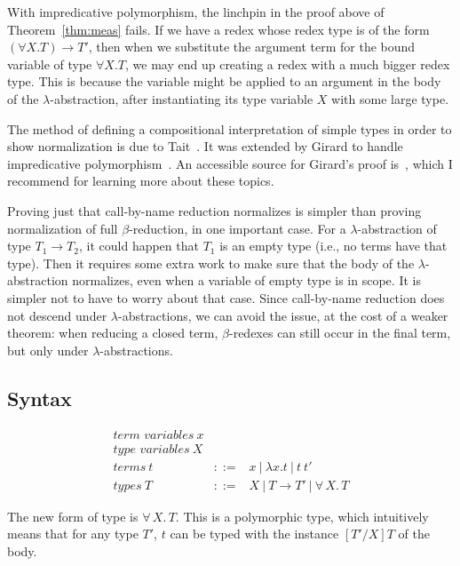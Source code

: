 \documentclass{article}
\begin{document}
With impredicative polymorphism, the linchpin in the proof above of
Theorem~\ref{thm:meas} fails.  If we have a redex whose redex type is
of the form $(\forall X.T) \to T'$, then when we substitute the
argument term for the bound variable of type $\forall X.T$, we may end
up creating a redex with a much bigger redex type.  This is because
the variable might be applied to an argument in the body of the
$\lambda$-abstraction, after instantiating its type variable $X$ with
some large type.

The method of defining a compositional interpretation of simple types in
order to show normalization is due to Tait~\cite{tait67}.  It was extended by Girard
to handle impredicative polymorphism~\cite{girard72}.  An accessible source
for Girard's proof is~\citet{girard1989}, which
I recommend for learning more about these topics.

Proving just that call-by-name reduction normalizes is simpler than
proving normalization of full $\beta$-reduction, in one important
case.  For a $\lambda$-abstraction of type $T_1 \to T_2$, it could
happen that $T_1$ is an empty type (i.e., no terms have that type).
Then it requires some extra work to make sure that the body of the
$\lambda$-abstraction normalizes, even when a variable of empty type
is in scope.  It is simpler not to have to worry about that case.
Since call-by-name reduction does not descend under
$\lambda$-abstractions, we can avoid the issue, at the cost of a
weaker theorem: when reducing a closed term, $\beta$-redexes can still
occur in the final term, but only under $\lambda$-abstractions.

\subsection{Syntax}
\label{sec:syntax}

\[
\begin{array}{lll}
\textit{term variables}\ x & \ & \ \\
\textit{type variables}\ X & \ & \ \\
\textit{terms}\ t & ::= & x \ |\ \lambda x .t\ |\ t\ t'\\
\textit{types}\ T & ::= & X\ |\ T \to T'\ |\ \forall\, X.\, T
\end{array}
\]

The new form of type is $\forall\, X.\,T$.  This is a polymorphic
type, which intuitively means that for any type $T'$, $t$ can be typed
with the instance $[T'/X]T$ of the body.  
\end{document}
